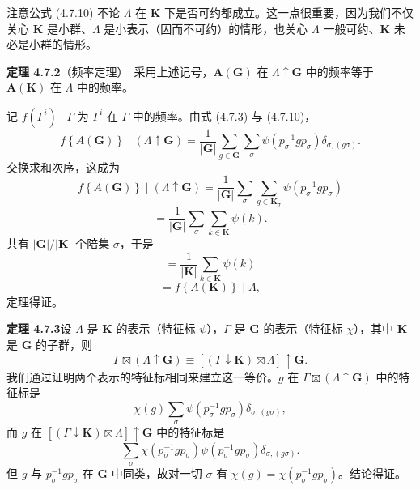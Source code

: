 注意公式 (4.7.10) 不论 $\Lambda$ 在 $\mathbf{K}$ 下是否可约都成立。这一点很重要，因为我们不仅关心 $\mathbf{K}$ 是小群、$\Lambda$ 是小表示（因而不可约）的情形，也关心 $\Lambda$ 一般可约、$\mathbf{K}$ 未必是小群的情形。

\noindent\textbf{定理 4.7.2}\quad （频率定理）\ 采用上述记号，$\mathbf{A}(\mathbf{G})$ 在 $\Lambda \uparrow \mathbf{G}$ 中的频率等于 $\mathbf{A}(\mathbf{K})$ 在 $\Lambda$ 中的频率。

记 $f(\Gamma^{i}) \mid \Gamma$ 为 $\Gamma^{i}$ 在 $\Gamma$ 中的频率。由式 (4.7.3) 与 (4.7.10)，
\begin{equation*}
f\left\{A(\mathbf{G})\right\} \mid (\Lambda \uparrow \mathbf{G}) = \frac{1}{|\mathbf{G}|}\sum_{g \in \mathbf{G}}\sum_{\sigma}\psi(p^{-1}_{\sigma}gp_{\sigma})\delta_{\sigma, (g\sigma)}.
\tag{4.7.12}
\end{equation*}
交换求和次序，这成为
\begin{equation*}
f\left\{A(\mathbf{G})\right\} \mid (\Lambda \uparrow \mathbf{G}) = \frac{1}{|\mathbf{G}|}\sum_{\sigma}\sum_{g \in \mathbf{K}_{\sigma}}\psi(p^{-1}_{\sigma}gp_{\sigma})
\tag{4.7.13}
\end{equation*}
\begin{equation*}
= \frac{1}{|\mathbf{G}|}\sum_{\sigma}\sum_{k \in \mathbf{K}}\psi(k).
\tag{4.7.14}
\end{equation*}
共有 $|\mathbf{G}|/|\mathbf{K}|$ 个陪集 $\sigma$，于是
\begin{equation*}
= \frac{1}{|\mathbf{K}|}\sum_{k \in \mathbf{K}}\psi(k)
\tag{4.7.15}
\end{equation*}
\begin{equation*}
= f\left\{A(\mathbf{K})\right\} \mid \Lambda,
\tag{4.7.16}
\end{equation*}
定理得证。

\noindent\textbf{定理 4.7.3}\quad 设 $\Lambda$ 是 $\mathbf{K}$ 的表示（特征标 $\psi$），$\Gamma$ 是 $\mathbf{G}$ 的表示（特征标 $\chi$），其中 $\mathbf{K}$ 是 $\mathbf{G}$ 的子群，则
\begin{equation*}
\Gamma \boxtimes (\Lambda \uparrow \mathbf{G}) \equiv \left[(\Gamma \downarrow \mathbf{K}) \boxtimes \Lambda\right] \uparrow \mathbf{G}.
\tag{4.7.17}
\end{equation*}
我们通过证明两个表示的特征标相同来建立这一等价。$g$ 在 $\Gamma \boxtimes (\Lambda \uparrow \mathbf{G})$ 中的特征标是
\begin{equation*}
\chi(g)\sum_{\sigma}\psi(p^{-1}_{\sigma}gp_{\sigma})\delta_{\sigma, (g\sigma)},
\end{equation*}
而 $g$ 在 $\left[(\Gamma \downarrow \mathbf{K}) \boxtimes \Lambda\right] \uparrow \mathbf{G}$ 中的特征标是
\begin{equation*}
\sum_{\sigma}\chi(p^{-1}_{\sigma}gp_{\sigma})\psi(p^{-1}_{\sigma}gp_{\sigma})\delta_{\sigma, (g\sigma)}.
\end{equation*}
但 $g$ 与 $p^{-1}_{\sigma}gp_{\sigma}$ 在 $\mathbf{G}$ 中同类，故对一切 $\sigma$ 有 $\chi(g) = \chi(p^{-1}_{\sigma}gp_{\sigma})$。结论得证。

